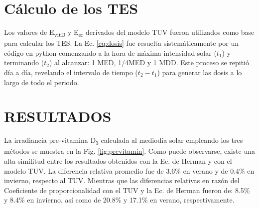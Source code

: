 \documentclass[10pt,twocolumn]{article}
\begin{document}
\section{Cálculo de los TES}
Los valores de E\textsubscript{vitD} y E\textsubscript{er} derivados del modelo TUV fueron utilizados como base para calcular los TES. La Ec. \ref{eq:dosis} fue resuelta sistemáticamente por un código en python comenzando a la hora de máxima intensidad solar ($t_1$) y terminando ($t_2$) al alcanzar: 1 MED, 1/4MED y 1 MDD. Este proceso se repitió día a día, revelando el intervalo de tiempo ($t_2-t_1$) para generar las dosis a lo largo de todo el periodo.

\section{RESULTADOS}
La irradiancia pre-vitamina D\textsubscript{3} calculada al mediodía solar empleando los tres métodos se muestra en la Fig. \ref{fig:previtamin}. Como puede observarse, existe una alta similitud entre los resultados obtenidos con la Ec. de Herman y con el modelo TUV. La diferencia relativa promedio fue de 3.6\% en verano y de 0.4\% en invierno, respecto al TUV. Mientras que las diferencias relativas en razón del Coeficiente de proporcionalidad con el TUV y la Ec. de Herman fueron de: 8.5\% y 8.4\% en invierno, así como de 20.8\% y 17.1\% en verano, respectivamente.
\end{document}
